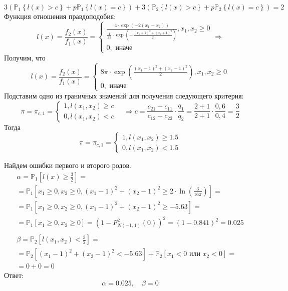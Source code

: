 \documentclass[14pt]{extarticle}
\begin{document}
$$
3\left(\mathbb{P}_1\left\{l\left(x\right)>c \right\} + p \mathbb{P}_1\left\{l\left(x\right)=c \right\}\right) + 3\left(\mathbb{P}_2\left\{l\left(x\right)>c \right\} + p \mathbb{P}_2\left\{l\left(x\right)=c \right\}\right) = 2
$$
Функция отношения правдоподобия:
$$
l\left(x\right)=\frac{f_2(x)}{f_1(x)}= \left\{\begin{array}{l}
\frac{4 \cdot \exp \left(-2\left(x_1 + x_2\right)\right)}{\frac{1}{2 \pi} \cdot \exp\left(-\frac{\left(x_1+1\right)^2+\left(x_2+1\right)^2}{2}\right)}, x_1, x_2 \geqslant 0 \\
0, \text { иначе}
\end{array}\right. \Longrightarrow
$$
Получим, что
$$
l\left(x\right)=\frac{f_2(x)}{f_1(x)}= \left\{\begin{array}{l}
8 \pi \cdot \exp\left(\frac{\left(x_1-1\right)^2+\left(x_2-1\right)^2}{2}\right), x_1, x_2 \geqslant 0 \\
0, \text { иначе }
\end{array}\right.
$$
Подставим одно из граничных значений для получения следующего критерия:
$$
\pi=\pi_{c, 1}=\left\{\begin{array}{l}
1, l\left(x_1, x_2\right) \geqslant c \\
0, l\left(x_1, x_2\right)<c
\end{array} \quad \Rightarrow c=\frac{c_{21}-c_{11}}{c_{12}-c_{22}} \cdot \frac{q_1}{q_2}=\frac{2+1}{2+1} \cdot \frac{0,6}{0,4}=\frac{3}{2}\right.
$$
Тогда
$$
\pi=\pi_{c, 1}=\left\{\begin{array}{l}
1, l\left(x_1, x_2\right) \geqslant 1.5 \\
0, l\left(x_1, x_2\right)<1.5
\end{array} \right.
$$

Найдем ошибки первого и второго родов.
\begin{gather*}
\alpha=\mathbb{P}_1\left[l(x) \geqslant \frac{3}{2}\right]= \\
=\mathbb{P}_1\left[x_1 \geqslant 0, x_2 \geqslant 0,\left(x_1-1\right)^2+\left(x_2-1\right)^2 \geqslant 2 \cdot \ln \left(\frac{3}{16 \pi}\right)\right]= \\
=\mathbb{P}_1\left[x_1 \geqslant 0, x_2 \geqslant 0,\left(x_1-1\right)^2+\left(x_2-1\right)^2 \geqslant-5.63\right] =\\
=\mathbb{P}_1\left[x_1 \geqslant 0, x_2 \geqslant 0\right]=\left(1-F_{N(-1,1)}^2(0)\right)^2=(1-0.841)^2=0.025
\\
\\
\beta=\mathbb{P}_2\left[l\left(x_1, x_2\right)<\frac{3}{2}\right]=\\
=\mathbb{P}_2\left[\left(x_1-1\right)^2+\left(x_2-1\right)^2<-5.63\right]+\mathbb{P}_2\left[x_1<0 \text { или } x_2<0\right]=\\
=0 + 0 = 0
\end{gather*}
Ответ:
\vspace{10pt}
$$ \alpha = 0.025, \quad \beta = 0$$
\end{document}
